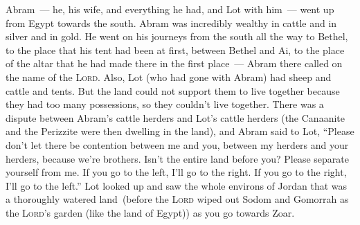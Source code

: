 
\begin{inparaenum}
   Abram~--- he, his wife, and everything he had, and Lot with him~--- went up from Egypt towards the south.%
   Abram was incredibly wealthy in cattle and in silver and in gold.%
   He went on his journeys from the south all the way to Bethel, to the place that his tent had been at first, between Bethel and Ai,%
   to the place of the altar that he had made there in the first place~--- Abram there called on the name of the \textsc{Lord}.%
   Also, Lot (who had gone with Abram) had sheep and cattle and tents.%
   But the land could not support them to live together because they had too many possessions, so they couldn't live together.%
   There was a dispute between Abram's cattle herders and Lot's cattle herders (the Canaanite and the Perizzite were then dwelling in the land),%
   and Abram said to Lot, ``Please don't let there be contention between me and you, between my herders and your herders, because we're brothers.%
   Isn't the entire land before you? Please separate yourself from me. If you go to the left, I'll go to the right. If you go to the right, I'll go to the left.''%
   Lot looked up and saw the whole environs of Jordan that was a thoroughly watered land\understood\ (before the \textsc{Lord} wiped out Sodom and Gomorrah as the \textsc{Lord}'s garden (like the land of Egypt)) as you go towards Zoar.%

\end{inparaenum}
